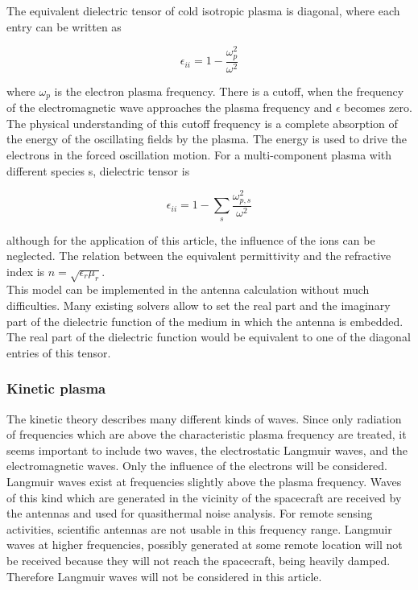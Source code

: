 \documentclass[draft,ras]{agutex}
\begin{document}
\begin{article}
The equivalent dielectric tensor of cold isotropic plasma is diagonal, where each entry can be written as


\begin{equation}\label{epsilon_plasma}
   \epsilon_{ii}=1-\frac{\omega_p^2 }{ \omega^2 }
\end{equation}

where $\omega_p$ is the electron plasma frequency. There is a cutoff, when the frequency of the electromagnetic wave approaches the plasma frequency and $\epsilon$ becomes zero. The physical understanding of this cutoff frequency is a complete absorption of the energy of the oscillating fields by the plasma. The energy is used to drive the electrons in the forced oscillation motion. For a multi-component plasma with different species s, dielectric tensor is

\begin{equation}
    \epsilon_{ii}=1-\sum_s \frac{\omega_{p,s}^2 }{ \omega^2 } 
\end{equation}

although for the application of this article, the influence of the ions can be neglected. The relation between the equivalent permittivity and the refractive index is $n=\sqrt{\epsilon_r\mu_r}$.\\ 

This model can be implemented in the antenna calculation without much difficulties. Many existing solvers allow to set the real part and the imaginary part of the dielectric function of the medium in which the antenna is embedded. The real part of the dielectric function would be equivalent to one of the diagonal entries of this tensor.\\

\subsubsection{Kinetic plasma}\label{sec_isotropic_kinetic_permittivity}
The kinetic theory describes many different kinds of waves. Since only radiation of frequencies which are above the characteristic plasma frequency are treated, it seems important to include two waves, the electrostatic Langmuir waves, and the electromagnetic waves. Only the influence of
the electrons will be considered.\\

Langmuir waves exist at frequencies slightly above the plasma frequency. Waves of this kind which are generated in the vicinity of the spacecraft are received by the antennas and used for quasithermal noise analysis. For remote sensing activities, scientific antennas are not usable in this frequency range. Langmuir waves at higher frequencies, possibly generated at some remote location will not be received because they will not reach the spacecraft, being heavily damped. Therefore Langmuir waves will not be considered in this article.\\


\end{article}
\end{document}
